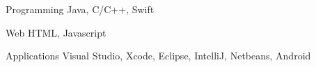 


\begin{cvskills}


\cvskill
{Programming} %
{Java, C/C++, Swift} %


\cvskill
{Web} %
{HTML, Javascript} %


\cvskill
{Applications} %
{Visual Studio, Xcode, Eclipse, IntelliJ, Netbeans, Android} %


\end{cvskills}

